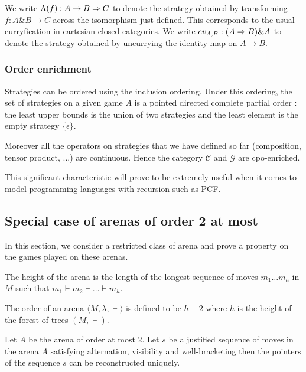We write $\Lambda(f) : A \rightarrow B \Rightarrow C$ to denote the
strategy obtained by transforming $f : A\&B \rightarrow C$ across
the isomorphism just defined. This corresponds to the usual
curryfication in cartesian closed categories. We write $ev_{A,B} :
(A \Rightarrow B) \& A$ to denote the strategy obtained by uncurrying the
identity map on $A \rightarrow B$.



\subsubsection{Order enrichment}

Strategies can be ordered using the inclusion ordering. Under this
ordering, the set of strategies on a given game $A$ is a pointed
directed complete partial order : the least upper bounds is the
union of two strategies and the least element is the empty strategy
$\{ \epsilon \}$.

Moreover all the operators on strategies that we have defined so far
(composition, tensor product, ...) are continuous. Hence the
category $\mathcal{C}$ and $\mathcal{G}$ are cpo-enriched.

This significant characteristic will prove to be extremely useful
when it comes to model programming languages with recursion such as
PCF.

\subsection{Special case of arenas of order 2 at most}
In this section, we consider a restricted class of arena and prove a
property on the games played on these arenas.

The height of the arena is the length of the longest sequence of moves
$m_1 \ldots m_h$ in $M$ such that $m_1 \vdash m_2 \vdash \ldots \vdash m_h$.

The order of an arena $\langle M, \lambda, \vdash \rangle$ is defined to be
$h-2$ where $h$ is the height of the forest of trees $(M, \vdash)$.


\begin{lem}
Let $A$ be the arena of order at most 2. Let $s$ be a justified sequence of moves in the arena $A$ satisfying
 alternation, visibility and well-bracketing then
the pointers of the sequence $s$ can be reconstructed uniquely.
\end{lem}



